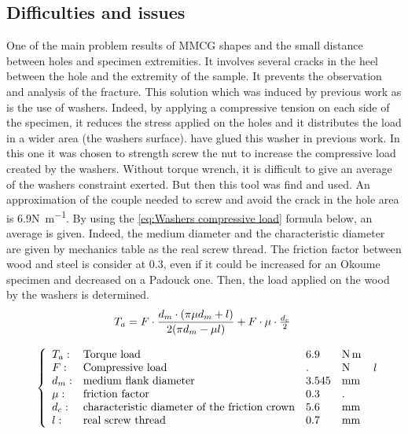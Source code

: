 \newpage
\subsection{Difficulties and issues}

One of the main problem results of MMCG shapes and the small distance between holes and specimen extremities. It involves several cracks in the heel between the hole and the extremity of the sample. It prevents the observation and analysis of the fracture. This solution which was induced by previous work as \parencite{Reference7} is the use of washers. Indeed, by applying a compressive tension on each side of the specimen, it reduces the stress applied on the holes and it distributes the load in a wider area (the washers surface). \parencite{Reference7} have glued this washer in previous work. In this one it was chosen to strength screw the nut to increase the compressive load created by the washers. Without torque wrench, it is difficult to give an average of the washers constraint exerted. But then this tool was find and used. An approximation of the couple needed to screw and avoid the crack in the hole area is 6.9\si{\newton\per\meter}. By using the \ref{eq:Washers compressive load} formula below, an average is given. Indeed, the medium diameter and the characteristic diameter are given by mechanics table as the real screw thread. The friction factor between wood and steel is consider at 0.3, even if it could be increased for an Okoume specimen and decreased on a Padouck one. Then, the load applied on the wood by the washers is determined.
\begin{equation}
	\begin{array}{c}
	T_{a}=F\cdot\dfrac{d_{m}\cdot (\pi\mu d_{m} + l)}{2(\pi d_{m}-\mu l)} + F\cdot\mu\cdot\frac{d_{c}}{2}
	\\
	\\
	\left\{
	\begin{array}{llllll}
		T_{a}: & $Torque load$ & 6.9 &\si{\newton\meter} \\
		F: & $Compressive load$ & . & \si{\newton} \\
		d_{m}: & $medium flank diameter$ & 3.545 & \si{\milli\meter} \\ 
		\mu: & $friction factor $ & 0.3 & . \\
		d_{c}: & $characteristic diameter of the friction crown$ & 5.6 & \si{\milli\meter} \\
		l: & $real screw thread$ & 0.7 & \si{\milli\meter} \\
	\end{array}
	\right.
	\end{array}{l}
	\label{eq:Washers compressive load}
\end{equation} 
